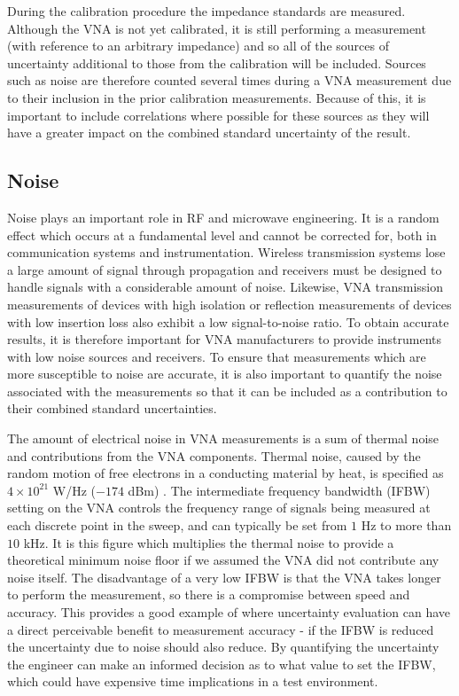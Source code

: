\documentclass[../thesis/thesis.tex]{subfiles}
\begin{document}
\begin{refsection}
During the calibration procedure the impedance standards are measured. Although the VNA is not yet calibrated, it is still performing a measurement (with reference to an arbitrary impedance) and so all of the sources of uncertainty additional to those from the calibration will be included. Sources such as noise are therefore counted several times during a VNA measurement due to their inclusion in the prior calibration measurements. Because of this, it is important to include correlations where possible for these sources as they will have a greater impact on the combined standard uncertainty of the result.

\subsection{Noise}

Noise plays an important role in RF and microwave engineering. It is a random effect which occurs at a fundamental level and cannot be corrected for, both in communication systems and instrumentation. Wireless transmission systems lose a large amount of signal through propagation and receivers must be designed to handle signals with a considerable amount of noise. Likewise, VNA transmission measurements of devices with high isolation or reflection measurements of devices with low insertion loss also exhibit a low signal-to-noise ratio. To obtain accurate results, it is therefore important for VNA manufacturers to provide instruments with low noise sources and receivers. To ensure that measurements which are more susceptible to noise are accurate, it is also important to quantify the noise associated with the measurements so that it can be included as a contribution to their combined standard uncertainties.

The amount of electrical noise in VNA measurements is a sum of thermal noise and contributions from the VNA components. Thermal noise, caused by the random motion of free electrons in a conducting material by heat, is specified as $4\times 10^{21}$ W/Hz ($-174$ dBm) \cite{Hiebel_2008}. The intermediate frequency bandwidth (IFBW) setting on the VNA controls the frequency range of signals being measured at each discrete point in the sweep, and can typically be set from $1$ Hz to more than $10$ kHz. It is this figure which multiplies the thermal noise to provide a theoretical minimum noise floor if we assumed the VNA did not contribute any noise itself. The disadvantage of a very low IFBW is that the VNA takes longer to perform the measurement, so there is a compromise between speed and accuracy. This provides a good example of where uncertainty evaluation can have a direct perceivable benefit to measurement accuracy - if the IFBW is reduced the uncertainty due to noise should also reduce. By quantifying the uncertainty the engineer can make an informed decision as to what value to set the IFBW, which could have expensive time implications in a test environment.


\end{refsection}
\end{document}
